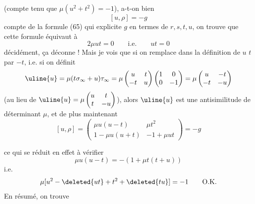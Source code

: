 (compte tenu que $\mu(u^2+t^2)=-1$),  a-t-on bien
\[
[u,\rho]=-g
\]
compte de la formule (65) qui explicite $g$ en
termes de $r,s,t,u$, on trouve que cette formule
 équivaut à
\[
2\mu ut=0\qquad\text{i.e.}\qquad ut=0
\]
décidément, ça déconne ! Mais je vois que si on
remplace dans la définition de $u$ $t$ par $-t$,
i.e. si on définit
\[
\uline{u}=\mu(t\sigma_\infty+u)\tau_\infty
=\mu\begin{pmatrix}u&t\\-t&u\end{pmatrix}
\begin{pmatrix}1&0\\0&-1\end{pmatrix}
=\mu\begin{pmatrix}u&-t\\-t&-u\end{pmatrix}
\]
(au lieu de $\uline{u}=\mu\begin{pmatrix}u&t\\t&-u\end{pmatrix}$),
alors $\uline{u}$ est 
une antisimilitude de déterminant $\mu$, et de
plus maintenant
\[
[u,\rho]=\begin{pmatrix}
\mu u(u-t)&\mu t^2\\
1-\mu u(u+t)&-1+\mu ut
\end{pmatrix}=-g
\]


ce qui se réduit en effet à vérifier
\[
\mu u(u-t)=-(1+\mu t(t+u))
\]
i.e.
\[
\mu[u^2-\deleted{ut}+t^2+\deleted{tu}]=-1
\qquad\text{O.K.}
\]
En résumé, on trouve

